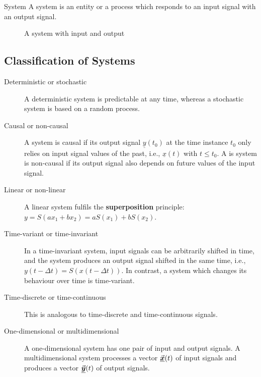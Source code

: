 \begin{refsection}
\begin{definition}{System}
	A system is an entity or a process which responds to an input signal with an output signal.
	
	\begin{figure}[H]
		\centering
		\caption{A system with input and output}
	\end{figure}
\end{definition}

\subsection{Classification of Systems}

\begin{description}
	\item[Deterministic or stochastic] A deterministic system is predictable at any time, whereas a stochastic system is based on a random process.
	\item[Causal or non-causal] A system is causal if its output signal $\underline{y}(t_0)$ at the time instance $t_0$ only relies on input signal values of the past, i.e., $\underline{x}(t)$ with $ t \leq t_0$. A is system is non-causal if its output signal also depends on future values of the input signal.
	\item[Linear or non-linear] A linear system fulfils the \textbf{superposition} principle: $y = S(a x_1 + b x_2) = a S(x_1) + b S(x_2)$.
	\item[Time-variant or time-invariant] In a time-invariant system, input signals can be arbitrarily shifted in time, and the system produces an output signal shifted in the same time, i.e., $y(t - \Delta t) = S(x(t - \Delta t))$. In contrast, a system which changes its behaviour over time is time-variant.
	\item[Time-discrete or time-continuous] This is analogous to time-discrete and time-continuous signals.
	\item[One-dimensional or multidimensional] A one-dimensional system has one pair of input and output signals. A multidimensional system processes a vector $\vec{\bm{\underline{x}}}(t)$ of input signals and produces a vector $\vec{\bm{\underline{y}}}(t)$ of output signals.
\end{description}


\end{refsection}
